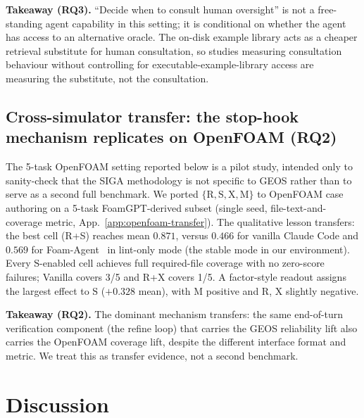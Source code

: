 \documentclass{article}
\begin{document}
\textbf{Takeaway (RQ3).} ``Decide when to consult human oversight'' is not a free-standing agent capability in this setting; it is conditional on whether the agent has access to an alternative oracle. The on-disk example library acts as a cheaper retrieval substitute for human consultation, so studies measuring consultation behaviour without controlling for executable-example-library access are measuring the substitute, not the consultation.

\subsection{Cross-simulator transfer: the stop-hook mechanism replicates on OpenFOAM (RQ2)}
\label{subsec:openfoam-transfer}

The 5-task OpenFOAM setting reported below is a pilot study, intended only to sanity-check that the SIGA methodology is not specific to GEOS rather than to serve as a second full benchmark. We ported $\{\mathrm{R,S,X,M}\}$ to OpenFOAM case authoring on a 5-task FoamGPT-derived subset (single seed, file-text-and-coverage metric, App.~\ref{app:openfoam-transfer}). The qualitative lesson transfers: the best cell (R+S) reaches mean $0.871$, versus $0.466$ for vanilla Claude Code and $0.569$ for Foam-Agent~\citep{foamagent2025} in lint-only mode (the stable mode in our environment). Every $\mathrm{S}$-enabled cell achieves full required-file coverage with no zero-score failures; Vanilla covers 3/5 and R+X covers 1/5. A factor-style readout assigns the largest effect to $\mathrm{S}$ ($+0.328$ mean), with $\mathrm{M}$ positive and $\mathrm{R}$, $\mathrm{X}$ slightly negative.

\textbf{Takeaway (RQ2).} The dominant mechanism transfers: the same end-of-turn verification component (the refine loop) that carries the GEOS reliability lift also carries the OpenFOAM coverage lift, despite the different interface format and metric. We treat this as transfer evidence, not a second benchmark.


\section{Discussion}
\label{sec:discussion}
\label{sec:analysis}
\label{subsec:limitations}
\end{document}
